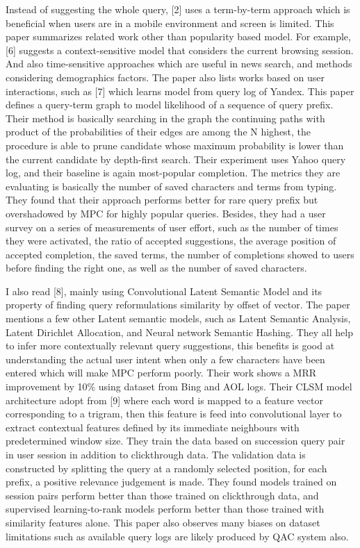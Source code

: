 \documentclass[12pt]{article} %
\begin{document}
Instead of suggesting the whole query, [2] uses a term-by-term approach which is beneficial when users are in a mobile environment and screen is limited. This paper summarizes related work other than popularity based model. For example,  [6] suggests a context-sensitive model that considers the current browsing session. And also time-sensitive approaches which are useful in news search, and methods considering demographics factors. The paper also lists works based on user interactions, such as [7] which learns model from query log of Yandex. This paper defines a query-term graph to model likelihood of a sequence of query prefix. Their method is basically searching in the graph the  continuing paths with product of the probabilities of their edges are among the N highest, the procedure is able to prune candidate whose maximum probability is lower than the current candidate by depth-first search. Their experiment uses Yahoo query log, and their baseline is again most-popular completion. The metrics they are evaluating is basically the number of saved characters and terms from typing. They found that their approach performs better for rare query prefix but overshadowed by MPC for highly popular queries. Besides, they had a user survey on a series of measurements of user effort, such as the number of times they were activated, the ratio of accepted suggestions, the average position of accepted completion, the saved terms, the number of completions showed to users before finding the right one, as well as the number of saved characters.

I also read [8], mainly using Convolutional Latent Semantic Model and its property of finding query reformulations similarity by offset of vector. The paper mentions a few other Latent semantic models, such as Latent Semantic Analysis, Latent Dirichlet Allocation, and Neural network Semantic Hashing. They all help to infer more contextually relevant query suggestions, this benefits is good at understanding the actual user intent when only a few characters have been entered which will make MPC perform poorly. Their work shows a MRR improvement by 10\% using dataset from Bing and AOL logs. Their CLSM model architecture adopt from [9] where each word is mapped to a feature vector corresponding to a trigram, then this feature is feed into convolutional layer to extract contextual features defined by its immediate neighbours with predetermined window size. They train the data based on succession query pair in user session in addition to clickthrough data. The validation data is constructed by splitting the query at a randomly selected position, for each prefix, a positive relevance judgement is made. They found models trained on session pairs perform better than those trained on clickthrough data, and supervised learning-to-rank models perform better than those trained with similarity features alone. This paper also observes many biases on dataset limitations such as available query logs are likely produced by QAC system also.
\end{document}
